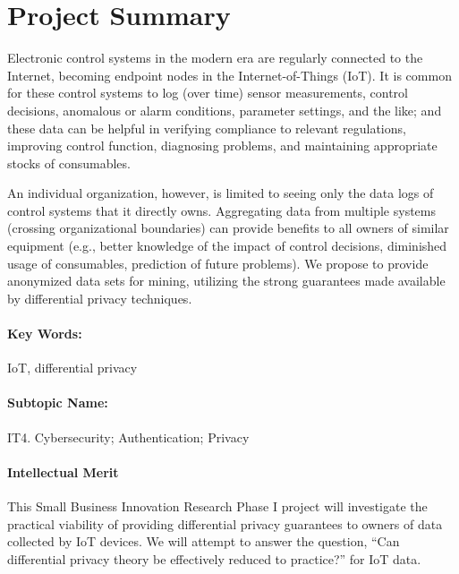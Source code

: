 \clearpage
\section*{Project Summary}

%

Electronic control systems in the modern era are regularly connected
to the Internet, becoming endpoint nodes in the Internet-of-Things (IoT).
It is common for these control systems to log (over time) sensor measurements,
control decisions, anomalous or alarm conditions, parameter settings,
and the like; and these data can be helpful in verifying compliance to
relevant regulations, improving control function, diagnosing problems,
and maintaining appropriate stocks of consumables.

An individual organization, however, is limited to seeing only the data logs
of control systems that it directly owns. Aggregating data from multiple
systems (crossing organizational boundaries) can provide benefits to all
owners of similar equipment (e.g., better knowledge of the impact of
control decisions, diminished usage of consumables, prediction of future
problems). We propose to provide anonymized data sets for mining, utilizing
the strong guarantees made available by differential privacy techniques.

\paragraph{Key Words:} IoT, differential privacy

\paragraph{Subtopic Name:} IT4. Cybersecurity; Authentication; Privacy

\medskip

\paragraph{Intellectual Merit}
This Small Business Innovation Research Phase I project will investigate
the practical viability of providing differential privacy guarantees to
owners of data collected by IoT devices.  We will attempt to answer the
question, ``Can differential privacy theory be effectively reduced to
practice?'' for IoT data.

